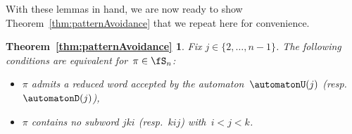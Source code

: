 With these lemmas in hand, we are now ready to show Theorem~\ref{thm:patternAvoidance} that we repeat here for convenience.

\newtheorem*{thm:patternAvoidance}{Theorem~\ref{thm:patternAvoidance}}
\begin{thm:patternAvoidance}
Fix $j \in \{2, \dots, n-1\}$.
The following conditions are equivalent for~${\pi \in \fS_n}$:
\begin{itemize}
	\item $\pi$ admits a reduced word accepted by the automaton~$\automatonU(j)$ (resp.~$\automatonD(j)$),
	\item $\pi$ contains no subword $jki$ (resp.~$kij$) with~$i < j < k$.
\end{itemize}
\end{thm:patternAvoidance}

